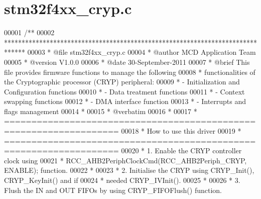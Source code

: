 \section{stm32f4xx\+\_\+cryp.\+c}
\label{stm32f4xx__cryp_8c_source}

\begin{DoxyCode}
00001 \textcolor{comment}{/**}
00002 \textcolor{comment}{  ******************************************************************************}
00003 \textcolor{comment}{  * @file    stm32f4xx\_cryp.c}
00004 \textcolor{comment}{  * @author  MCD Application Team}
00005 \textcolor{comment}{  * @version V1.0.0}
00006 \textcolor{comment}{  * @date    30-September-2011}
00007 \textcolor{comment}{  * @brief   This file provides firmware functions to manage the following }
00008 \textcolor{comment}{  *          functionalities of the  Cryptographic processor (CRYP) peripheral:           }
00009 \textcolor{comment}{  *           - Initialization and Configuration functions}
00010 \textcolor{comment}{  *           - Data treatment functions }
00011 \textcolor{comment}{  *           - Context swapping functions     }
00012 \textcolor{comment}{  *           - DMA interface function       }
00013 \textcolor{comment}{  *           - Interrupts and flags management       }
00014 \textcolor{comment}{  *}
00015 \textcolor{comment}{  *  @verbatim}
00016 \textcolor{comment}{  *                               }
00017 \textcolor{comment}{  *          ===================================================================      }
00018 \textcolor{comment}{  *                                 How to use this driver}
00019 \textcolor{comment}{  *          =================================================================== }
00020 \textcolor{comment}{  *          1. Enable the CRYP controller clock using }
00021 \textcolor{comment}{  *              RCC\_AHB2PeriphClockCmd(RCC\_AHB2Periph\_CRYP, ENABLE); function.}
00022 \textcolor{comment}{  *}
00023 \textcolor{comment}{  *          2. Initialise the CRYP using CRYP\_Init(), CRYP\_KeyInit() and if }
00024 \textcolor{comment}{  *             needed CRYP\_IVInit(). }
00025 \textcolor{comment}{  *}
00026 \textcolor{comment}{  *          3. Flush the IN and OUT FIFOs by using CRYP\_FIFOFlush() function.}

\end{DoxyCode}
